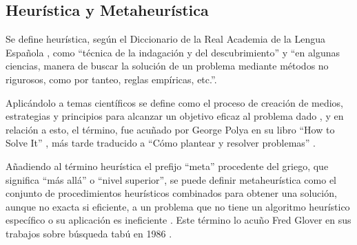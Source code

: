 \subsection{Heurística y Metaheurística}
\label{sec:heu-meta}
Se define heurística, según el Diccionario de la Real Academia de la Lengua Española \cite{rae-heuristica}, como ``técnica de la indagación y del descubrimiento'' y ``en algunas ciencias, manera de buscar la solución de un problema mediante métodos no rigurosos, como por tanteo, reglas empíricas, etc.''.

Aplicándolo a temas científicos se define como el proceso de creación de medios, estrategias y principios para alcanzar un objetivo eficaz al problema dado \cite{conceptodef-heuristica}, y en relación a esto, el término, fue acuñado por George Polya en su libro ``How to Solve It'' \cite{gpolya-book-1}, más tarde traducido a ``Cómo plantear y resolver problemas'' \cite{gpolya-book-2}.

Añadiendo al término heurística el prefijo ``meta'' procedente del griego, que significa ``más allá'' o ``nivel superior'', se puede definir metaheurística como el conjunto de procedimientos heurísticos combinados para obtener una solución, aunque no exacta si eficiente, a un problema que no tiene un algoritmo heurístico específico o su aplicación es ineficiente \cite{wiki-metaheuristica}. Este término lo acuño Fred Glover en sus trabajos sobre búsqueda tabú en 1986 \cite{fred-glover}.

